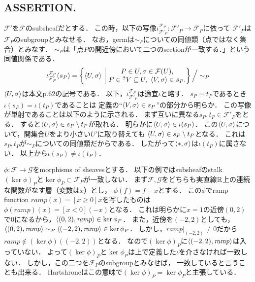 \documentclass[a4paper]{jsarticle}
\newcommand{\shF}{\mathcal{F}}
\newcommand{\shG}{\mathcal{G}}
\begin{document}
    \subsection{ASSERTION.}
    $\shF'$を$\shF$のsubsheafだとする．
    この時，以下の写像$\iota_{\shF'_P}^{\shF_P}: \shF'_P \to \shF_P$に依って
    $\shF'_P$は$\shF_P$のsubgroupとみなせる．
    なお，germは$\sim_P$についての同値類（点ではなく集合）とみなす．
    $\sim_P$は「点$P$の開近傍において二つのsectionが一致する．」という同値関係である．
    \[
    \iota_{\shF'_P}^{\shF_P}(s_P)=
        \left\{ \germ{U}{\sigma} ~\middle|~ 
            \begin{array}{@{}c@{}}
                P \in U, \sigma \in \shF(U), \\ 
                P \in {}^{\exists}{V} \subseteq U,~ \germ{V}{\sigma} \in s_P.
            \end{array}
        \right\}
        \Big/ \sim_P
    \]
    $\langle U,\sigma \rangle$は本文p.62の記号である．
    以下，$\iota_{\shF'_P}^{\shF_P}$は適宜$\iota$と略す．
    $s_P=t_P$であるとき$\iota(s_P)=\iota(t_P)$であることは
    定義の``$\langle V,\sigma \rangle \in s_P$''の部分から明らか．
    この写像が単射であることは以下のように示される．
    まず互いに異なる$s_P, t_P \in \shF'_P$をとる．
    すると$\langle U,\sigma \rangle \in s_P \setminus t_P$が取れる．
    明らかに$\langle U,\sigma \rangle \in \iota(s_P)$．
    この$\langle U,\sigma \rangle$について，開集合$U$をより小さい$U'$に取り替えても
    $\langle U,\sigma \rangle \in s_P \setminus t_P$となる．
    これは$s_P, t_P$が$\sim_P$についての同値類だからである．
    したがって$\langle *,\sigma \rangle$は$\iota(t_P)$に属さない．
    以上から$\iota(s_P) \neq \iota(t_P)$．

    $\phi: \shF \to \shG$をmorphisms of sheavesとする．
    以下の例ではsubsheafのstalk $(\ker \phi)_P$と$\ker \phi_P \subset \shF_P$が一致しない．
    まず$\shF, \shG$をどちらも実直線$\mathbb{R}$上の連続な関数がなす層（変数は$x$）とし，
    $\phi(f)=f-x$とする．
    この$\phi$でramp function $\mathit{ramp}(x)=[x \geq 0]x$を写したものは
    $\phi(\mathit{ramp})(x)=[x<0](-x)$となる．
    これは明らかに$x=1$の近傍$(0,2)$で0になるから，$\langle (0,2),\mathit{ramp} \rangle \in \ker \phi_P$．
    また，近傍を$(-2,2)$としても，
    $\langle (0,2),\mathit{ramp} \rangle \sim_P \langle (-2,2),\mathit{ramp} \rangle \in \ker \phi_P$．
    しかし，$\mathit{ramp}|_{(-2,2)} \neq 0$だから
    $\mathit{ramp} \not \in (\ker \phi)((-2,2))$となる．
    なので$(\ker \phi)_P$に$\langle (-2,2),\mathit{ramp} \rangle$は入っていない．
    よって$(\ker \phi)_P$と$\ker \phi_P$は上で定義した$\iota$を介さなければ一致しない．
    しかし，この二つを$\shF_P$のsubgroupとみなせば，
    一致していると言うことも出来る．
    Hartshroneはこの意味で$(\ker \phi)_P=\ker \phi_P$と主張している．
\end{document}
